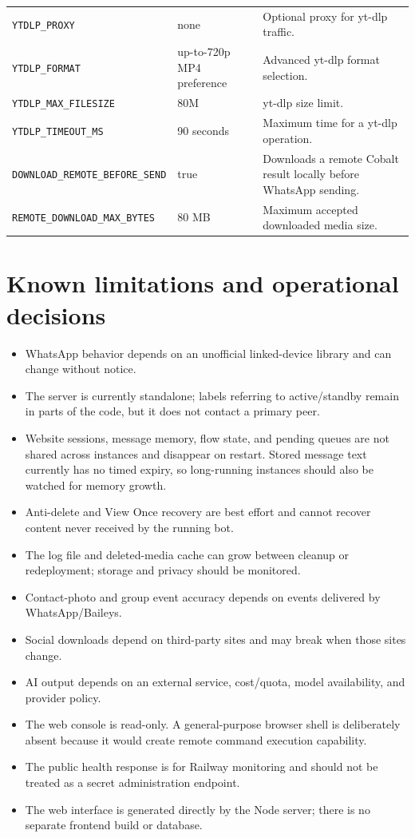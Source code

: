 \documentclass[11pt,a4paper]{article}
\begin{document}
\begin{longtable}{p{}p{}p{}}
\texttt{YTDLP\_PROXY} & none & Optional proxy for yt-dlp traffic.\\
\texttt{YTDLP\_FORMAT} & up-to-720p MP4 preference & Advanced yt-dlp format selection.\\
\texttt{YTDLP\_MAX\_FILESIZE} & 80M & yt-dlp size limit.\\
\texttt{YTDLP\_TIMEOUT\_MS} & 90 seconds & Maximum time for a yt-dlp operation.\\
\nolinkurl{DOWNLOAD_REMOTE_BEFORE_SEND} & true & Downloads a remote Cobalt result locally before WhatsApp sending.\\
\texttt{REMOTE\_DOWNLOAD\_MAX\_BYTES} & 80 MB & Maximum accepted downloaded media size.\\
\bottomrule
\end{longtable}

\section{Known limitations and operational decisions}

\begin{itemize}
  \item WhatsApp behavior depends on an unofficial linked-device library and can change without notice.
  \item The server is currently standalone; labels referring to active/standby remain in parts of the code, but it does not contact a primary peer.
  \item Website sessions, message memory, flow state, and pending queues are not shared across instances and disappear on restart. Stored message text currently has no timed expiry, so long-running instances should also be watched for memory growth.
  \item Anti-delete and View Once recovery are best effort and cannot recover content never received by the running bot.
  \item The log file and deleted-media cache can grow between cleanup or redeployment; storage and privacy should be monitored.
  \item Contact-photo and group event accuracy depends on events delivered by WhatsApp/Baileys.
  \item Social downloads depend on third-party sites and may break when those sites change.
  \item AI output depends on an external service, cost/quota, model availability, and provider policy.
  \item The web console is read-only. A general-purpose browser shell is deliberately absent because it would create remote command execution capability.
  \item The public health response is for Railway monitoring and should not be treated as a secret administration endpoint.
  \item The web interface is generated directly by the Node server; there is no separate frontend build or database.
\end{itemize}
\end{document}
